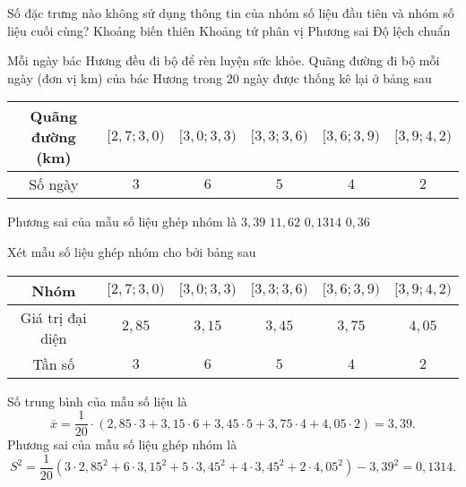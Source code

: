 \begin{ex}
	Số đặc trưng nào không sử dụng thông tin của nhóm số liệu đầu tiên và nhóm số liệu cuối cùng?
	\choice
	{Khoảng biến thiên}
	{\True Khoảng tứ phân vị}
	{Phương sai}
	{Độ lệch chuẩn}
\end{ex}
\begin{ex}%
	Mỗi ngày bác Hương đều đi bộ để rèn luyện sức khỏe. Quãng đường đi bộ mỗi ngày (đơn vị km) của bác Hương trong $20$ ngày được thống kê lại ở bảng sau
	\begin{center}
		\begin{tabular}{|c|c|c|c|c|c|}
			\hline
			Quãng đường (km) & $[2{,}7;3{,}0)$ & $[3{,}0;3{,}3)$ & $[3{,}3;3{,}6)$ & $[3{,}6;3{,}9)$ & $[3{,}9;4{,}2)$ \\
			\hline
			Số ngày          & $3$             & $6$             & $5$             & $4$             & $2$             \\
			\hline
		\end{tabular}
	\end{center}
	Phương sai của mẫu số liệu ghép nhóm là
	\choice
	{$3{,}39$}
	{$11{,}62$}
	{\True $0{,}1314$}
	{$0{,}36$}
	\loigiai
	{
	Xét mẫu số liệu ghép nhóm cho bởi bảng sau
	\begin{center}
		\begin{tabular}{|c|c|c|c|c|c|}
			\hline
			Nhóm             & $[2{,}7;3{,}0)$ & $[3{,}0;3{,}3)$ & $[3{,}3;3{,}6)$ & $[3{,}6;3{,}9)$ & $[3{,}9;4{,}2)$ \\
			\hline
			Giá trị đại diện & $2{,}85$        & $3{,}15$        & $3{,}45$        & $3{,}75$        & $4{,}05$        \\
			\hline
			Tần số           & $3$             & $6$             & $5$             & $4$             & $2$             \\
			\hline
		\end{tabular}
	\end{center}
	Số trung bình của mẫu số liệu là
	$$\overline{x}=\dfrac{1}{20}\cdot (2{,}85\cdot 3+3{,}15\cdot 6+3{,}45\cdot 5+3{,}75\cdot 4+4{,}05\cdot 2)=3{,}39.$$
	Phương sai của mẫu số liệu ghép nhóm là
	$$S^2=\dfrac{1}{20}\left(3\cdot 2{,}85^2+6\cdot 3{,}15^2+5\cdot 3{,}45^2+4\cdot 3{,}45^2+2\cdot 4{,}05^2\right)-3{,}39^2=0{,}1314.$$
	}
\end{ex}

